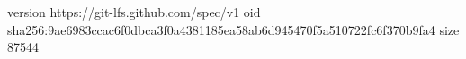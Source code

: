 version https://git-lfs.github.com/spec/v1
oid sha256:9ae6983ccac6f0dbca3f0a4381185ea58ab6d945470f5a510722fc6f370b9fa4
size 87544
